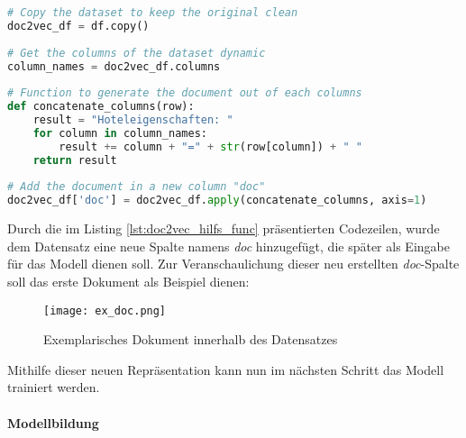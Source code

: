 \begin{lstlisting}[language=Python, label=lst:doc2vec_hilfs_func, caption=Hilfsfunktion zur Erzeugung von textbasierten Dokumenten]
# Copy the dataset to keep the original clean
doc2vec_df = df.copy()
    
# Get the columns of the dataset dynamic
column_names = doc2vec_df.columns
    
# Function to generate the document out of each columns
def concatenate_columns(row):
    result = "Hoteleigenschaften: "
    for column in column_names:
        result += column + "=" + str(row[column]) + " "
    return result
    
# Add the document in a new column "doc"
doc2vec_df['doc'] = doc2vec_df.apply(concatenate_columns, axis=1)
\end{lstlisting}

Durch die im Listing \ref{lst:doc2vec_hilfs_func} präsentierten Codezeilen, wurde dem Datensatz eine neue Spalte namens \emph{doc} hinzugefügt, die später als Eingabe für das Modell dienen soll. Zur Veranschaulichung dieser neu erstellten \emph{doc}-Spalte soll das erste Dokument als Beispiel dienen:

\begin{figure}[h]
    \centering
    \texttt{[image: ex\_doc.png]}
    \caption[Exemplarisches Dokument innerhalb des Datensatzes]{Exemplarisches Dokument innerhalb des Datensatzes}
    \label{img:ex_doc}
\end{figure}

Mithilfe dieser neuen Repräsentation kann nun im nächsten Schritt das Modell trainiert werden.

\paragraph{Modellbildung}

